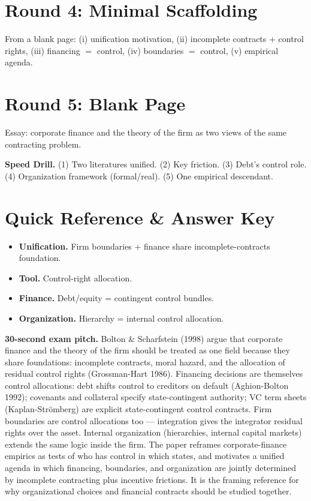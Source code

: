 \documentclass[11pt]{article}
\begin{document}
\section*{Round 4: Minimal Scaffolding}
From a blank page: (i) unification motivation, (ii) incomplete contracts + control rights, (iii) financing $=$ control, (iv) boundaries $=$ control, (v) empirical agenda.

\section*{Round 5: Blank Page}
Essay: corporate finance and the theory of the firm as two views of the same contracting problem.

\vspace{6pt}
\begin{drillbox}
\textbf{Speed Drill.} (1) Two literatures unified. (2) Key friction. (3) Debt's control role. (4) Organization framework (formal/real). (5) One empirical descendant.
\end{drillbox}

\section*{Quick Reference \& Answer Key}
\begin{answerbox}
\begin{itemize}
\item \textbf{Unification.} Firm boundaries + finance share incomplete-contracts foundation.
\item \textbf{Tool.} Control-right allocation.
\item \textbf{Finance.} Debt/equity = contingent control bundles.
\item \textbf{Organization.} Hierarchy = internal control allocation.
\end{itemize}
\end{answerbox}

\begin{keybox}
\textbf{30-second exam pitch.} Bolton \& Scharfstein (1998) argue that corporate finance and the theory of the firm should be treated as one field because they share foundations: incomplete contracts, moral hazard, and the allocation of residual control rights (Grossman-Hart 1986). Financing decisions are themselves control allocations: debt shifts control to creditors on default (Aghion-Bolton 1992); covenants and collateral specify state-contingent authority; VC term sheets (Kaplan-Strömberg) are explicit state-contingent control contracts. Firm boundaries are control allocations too --- integration gives the integrator residual rights over the asset. Internal organization (hierarchies, internal capital markets) extends the same logic inside the firm. The paper reframes corporate-finance empirics as tests of who has control in which states, and motivates a unified agenda in which financing, boundaries, and organization are jointly determined by incomplete contracting plus incentive frictions. It is the framing reference for why organizational choices and financial contracts should be studied together.
\end{keybox}
\end{document}
